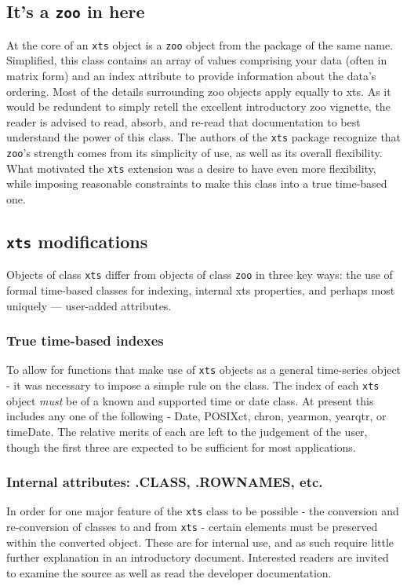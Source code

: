 \documentclass{article}
\begin{document}
\subsection{It's a {\tt zoo} in here}
At the core of an {\tt xts} object is a {\tt zoo} object from the package of
the same name. Simplified, this class contains an array of values
comprising your data (often in matrix form) and an index
attribute to provide information about
the data's ordering. Most of the details surrounding zoo
objects apply equally to xts. As it would be redundent to simply retell
the excellent introductory zoo vignette, the reader is advised to
read, absorb, and re-read that documentation to best
understand the power of this class. The authors of the {\tt xts}
package recognize that
{\tt zoo}'s strength comes from its
simplicity of use, as well as its overall flexibility.  What motivated the
{\tt xts} extension was a desire to have even more flexibility, while 
imposing reasonable constraints to make this class into a true time-based one.

\subsection{{\tt xts} modifications}
Objects of class {\tt xts} differ from objects of class 
{\tt zoo} in three key ways: the use of formal time-based
classes for indexing,
internal xts properties, and perhaps most uniquely
--- user-added attributes.

\subsubsection*{True time-based indexes}
To allow for functions that make use of {\tt xts} objects
as a general time-series object - it was necessary to
impose a simple rule on the class.  The index of each
{\tt xts} object \emph{must} be of a known and supported
time or date class.  At present this includes any one of
the following - Date, POSIXct, chron, yearmon, yearqtr, or
timeDate.  The relative merits of each are left to
the judgement of the user, though the first three are expected
to be sufficient for most applications.

\subsubsection*{Internal attributes: .CLASS, .ROWNAMES, etc.}
In order for one major feature of the {\tt xts} class
to be possible - the conversion and re-conversion of classes
to and from {\tt xts} - certain elements must be preserved within
the converted object.  These are for internal use, and
as such require little further explanation in an introductory
document. Interested readers are invited to examine the source as
well as read the developer documentation.
\end{document}
